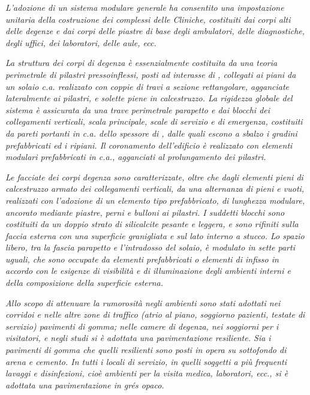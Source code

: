 \begin{quoting}
	\emph{L'adozione di un sistema modulare generale ha consentito una impostazione unitaria della costruzione dei complessi delle Cliniche, costituiti dai corpi alti delle degenze e dai corpi delle piastre di base degli ambulatori, delle diagnostiche, degli uffici, dei laboratori, delle aule, ecc.}
	
	\emph{La struttura dei corpi di degenza è essenzialmente costituita da una teoria perimetrale di pilastri pressoinflessi, posti ad interasse di , collegati ai piani da un solaio c.a. realizzato con coppie di travi a sezione rettangolare, agganciate lateralmente ai pilastri, e solette piene in calcestruzzo. La rigidezza globale del sistema è assicurata da una trave perimetrale parapetto e dai blocchi dei collegamenti verticali, scala principale, scale di servizio e di emergenza, costituiti da pareti portanti in c.a. dello spessore di , dalle quali escono a sbalzo i gradini prefabbricati ed i ripiani. Il coronamento dell'edificio è realizzato con elementi modulari prefabbricati in c.a., agganciati al prolungamento dei pilastri.}

\sdots

	\emph{Le facciate dei corpi degenza sono caratterizzate, oltre che dagli elementi pieni di calcestruzzo armato dei collegamenti verticali, da una alternanza di pieni e vuoti, realizzati con l'adozione di un elemento tipo prefabbricato, di lunghezza modulare, ancorato mediante piastre, perni e bulloni ai pilastri. I suddetti blocchi sono costituiti da un doppio strato di silicalcite pesante e leggera, e sono rifiniti sulla faccia esterna con una superficie granigliata e sul lato interno a stucco. Lo spazio libero, tra la fascia parapetto e l'intradosso del solaio, è modulato in sette parti uguali, che sono occupate da elementi prefabbricati o elementi di infisso in accordo con le esigenze di visibilità e di illuminazione degli ambienti interni e della composizione della superficie esterna.}

\sdots

	\emph{Allo scopo di attenuare la rumorosità negli ambienti sono stati adottati nei corridoi e nelle altre zone di traffico (atrio al piano, soggiorno pazienti, testate di servizio) pavimenti di gomma; nelle camere di degenza, nei soggiorni per i visitatori, e negli studi si è adottata una pavimentazione resiliente. Sia i pavimenti di gomma che quelli resilienti sono posti in opera su sottofondo di arena e cemento. In tutti i locali di servizio, in quelli soggetti a più frequenti lavaggi e disinfezioni, cioè ambienti per la visita medica, laboratori, ecc., si è adottata una pavimentazione in grés opaco.}


\end{quoting}
